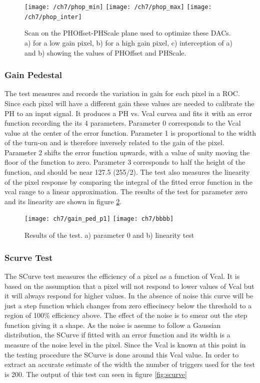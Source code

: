\begin{figure}[!h]
	\centering
	\texttt{[image: /ch7/phop\_min]}
	\texttt{[image: /ch7/phop\_max]}
	\texttt{[image: /ch7/phop\_inter]}
	\caption[PHOffset and PHScale scan]{Scan on the PHOffset-PHScale plane used to optimize these DACs. a) for a low gain pixel, b) for a high gain pixel, c) interception of a) and b) showing the values of PHOffset and PHScale.}
	\label{phovsphs}
\end{figure}

\subsubsection{Gain Pedestal}
The  test measures and records the variation in gain for each pixel in a ROC. Since each pixel will have a different gain these values are needed to calibrate the PH to an input signal. It produces a PH vs. Vcal curvea and fits it with an error function recording the its 4 parameters. Parameter 0 corresponds to
the Vcal value at the center of the error function. Parameter 1 is proportional to the width of the turn-on and is therefore inversely related to the gain of the pixel. Parameter 2 shifts the error function upwards, with a value of unity moving the floor of the function to zero. Parameter 3 corresponds to half the height of the function, and should be near 127.5 (255/2). {}%
The test also measures the linearity of the pixel response by comparing the integral of the fitted error function in the vcal range to a linear approximation. The results of the test for parameter zero and its linearity are shown in figure \ref{gainped}.

\begin{figure}[!h]
	\centering
	\texttt{[image: ch7/gain\_ped\_p1]}
	\texttt{[image: ch7/bbbb]}
	\caption[Gain pedestal test]{Results of the  test. a) parameter 0 and b) linearity test {}}
	\label{gainped}
\end{figure}

\subsubsection{Scurve Test}
The SCurve test measures the efficiency of a pixel as a function of Vcal. It is based on the assumption that a pixel will not respond to lower values of Vcal but it will always respond for higher values. In the absence of noise this curve will be just a step function which changes from zero effiecinecy below the threshold to a region of 100\% efficiency above. The effect of the noise is to smear out the step function giving it a  shape. As the noise is assume to follow a Gaussian distribution, the SCurve if fitted with an error function and its width is a measure of the noise level in the pixel. Since the Vcal is known at this point in the testing procedure the SCurve is done around this Vcal value. In order to extract an accurate estimate of the width the number of triggers used for the test is 200. The output of this test can seen in figure \ref{fig:scurve}

